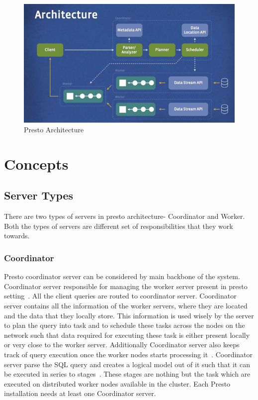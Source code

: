 \begin{figure}[!ht]
  \centering\includegraphics[width=\columnwidth]{image/presto-architecture.png}
  \caption{Presto Architecture~\cite{hid-sp18-502-presto-architecture}}\label{f:architecture}
\end{figure}

\section{Concepts}
\subsection{Server Types}
There are two types of servers in presto architecture- Coordinator and Worker.
Both the types of servers are different set of responsibilities that they work
towards.
\subsubsection{Coordinator}
Presto coordinator server can be considered by main backbone of the system.
Coordinator server responsible for managing the worker server present in presto
setting~\cite{hid-sp18-502-prestodb-concept}. All the client queries are routed
to coordinator server. Coordinator server contains all the information of the
worker servers, where they are located and the data that they locally store.
This information is used wisely by the server to plan the query into task and to
 schedule these tasks across the nodes on the network such that data required
 for executing these task is either present locally or very close to the worker
 server. Additionally Coordinator server also keeps track of query execution
 once the worker nodes starts
 processing it~\cite{hid-sp18-502-prestodb-concept}. Coordinator server parse
the SQL query and creates a logical model out of it such that it can be executed
 in series to stages~\cite{hid-sp18-502-prestodb-concept}. These stages are
 nothing but the task which are executed on distributed worker nodes available
 in the cluster. Each Presto installation needs at least one Coordinator server.

